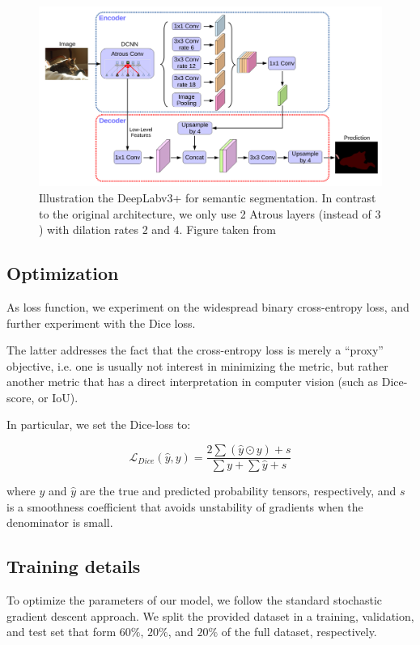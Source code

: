 \documentclass[11pt]{article}
\begin{document}
\begin{figure}[htbp]
\centering
\includegraphics[width=.9\linewidth]{./deeplabv3p.png}
\caption{\label{fig:deeplabv3p}Illustration the DeepLabv3+ for semantic segmentation. In contrast to the original architecture, we only use 2 Atrous layers (instead of \(3\)) with dilation rates \(2\) and \(4\). Figure taken from \cite{chen18}}
\end{figure}

\subsection{Optimization}
\label{sec:org4cd4da6}

As loss function, we experiment on the widespread binary cross-entropy loss,
and further experiment with the Dice loss.

The latter addresses the fact that the cross-entropy loss is merely a ``proxy'' objective,
i.e. one is usually not interest in minimizing the metric, but rather
another metric that has a direct interpretation in computer vision (such as Dice-score,
or IoU).

In particular, we set the Dice-loss to:

\[
\mathcal{L}_{Dice}(\hat{y}, y) = \frac{2 \sum (\hat{y} \odot y) + s}{\sum y + \sum \hat{y} + s}
\]

where \(y\) and \(\hat{y}\) are the true and predicted probability tensors, respectively,
and \(s\) is a smoothness coefficient that avoids unstability of gradients when
the denominator is small.

\subsection{Training details}
\label{sec:org1819a69}

To optimize the parameters of our model, we follow the standard stochastic gradient descent
approach.
We split the provided dataset in a training, validation, and test set
that form \(60\%\), \(20\%\), and \(20\%\) of the full dataset, respectively.
\end{document}
